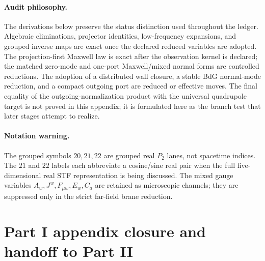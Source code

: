 \paragraph{Audit philosophy.}
The derivations below preserve the status distinction used throughout the ledger.  Algebraic eliminations, projector identities, low-frequency expansions, and grouped inverse maps are exact once the declared reduced variables are adopted.  The projection-first Maxwell law is exact after the observation kernel is declared; the matched zero-mode and one-port Maxwell/mixed normal forms are controlled reductions.  The adoption of a distributed wall closure, a stable BdG normal-mode reduction, and a compact outgoing port are reduced or effective moves.  The final equality of the outgoing-normalization product with the universal quadrupole target is not proved in this appendix; it is formulated here as the branch test that later stages attempt to realize.

\paragraph{Notation warning.}
The grouped symbols \(20,21,22\) are grouped real \(P_2\) lanes, not spacetime indices.  The \(21\) and \(22\) labels each abbreviate a cosine/sine real pair when the full five-dimensional real STF representation is being discussed.  The mixed gauge variables \(A_w,J^w,F_{\mu w},E_w,C_a\) are retained as microscopic channels; they are suppressed only in the strict far-field brane reduction.

\begingroup
\let\clearpage\relax
\clearpage

\clearpage

\clearpage

\clearpage

\clearpage

\clearpage

\clearpage

\clearpage

\clearpage

\clearpage

\clearpage

\clearpage

\clearpage

\clearpage

\clearpage

\clearpage

\clearpage

\clearpage

\clearpage

\clearpage

\clearpage

\clearpage

\clearpage

\endgroup

\section{Part I appendix closure and handoff to Part II}
\label{sec:app-part01-closure}

